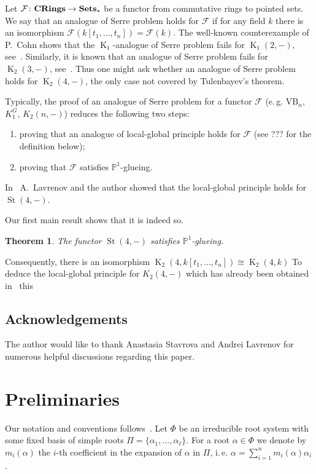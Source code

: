 \documentclass[oneside, 10pt]{amsart}
\DeclareMathOperator{\St}{St}
\DeclareMathOperator{\K}{K}
\newcommand{\catname}[1]{{\normalfont\textbf{#1}}}
\newtheorem{thm}{Theorem}
\numberwithin{equation}{section}
\numberwithin{lemma}{section}
\theoremstyle{definition}
\theoremstyle{remark}
\begin{document}
Let $\mathcal{F}\colon \catname{CRings} \to \catname{Sets}_*$ be a functor from commutative rings to pointed sets. We say that an analogue of Serre problem holds for $\mathcal{F}$ if for any field $k$ there is an isomorphism $\mathcal{F}(k[t_1, \ldots, t_n]) = \mathcal{F}(k)$. The well-known counterexample of P.~Cohn shows that the $\K_1$-analogue of Serre problem fails for $\K_1(2, -)$, see~\cite[\S~I.8]{Lam10}. Similarly, it is known that an analogue of Serre problem fails for $\K_2(3, -)$, see~\cite{We14}. Thus one might ask whether an analogue of Serre problem holds for $\K_2(4, -)$, the only case not covered by Tulenbayev's theorem.

Typically, the proof of an analogue of Serre problem for a functor $\mathcal{F}$ (e.\,g. $\mathrm{VB}_n$, $K_1^G$, $K_2(n, -)$) reduces the following two steps: 
\begin{enumerate}
 \item proving that an analogue of local-global principle holds for $\mathcal{F}$ (see ??? for the definition below);
 \item proving that $\mathcal{F}$ satisfies $\mathbb{P}^1$-glueing.
\end{enumerate}

In~\cite{LS17} A.~Lavrenov and the author showed that the local-global principle holds for $\St(4, -)$.


Our first main result shows that it is indeed so.
\begin{thm}
 The functor $\St(4, -)$ satisfies $\mathbb{P}^1$-glueing.
\end{thm}
Consequently, there is an isomorphism $\K_2(4, k[t_1, \ldots, t_n]) \cong \K_2(4, k)$
To deduce the local-global principle for $K_2(4, -)$ which has already been obtained in~\cite{LS17} this 


\subsection{Acknowledgements}
The author would like to thank Anastasia Stavrova and Andrei Lavrenov for numerous helpful discussions regarding this paper.

\section{Preliminaries}

Our notation and conventions follows~\cite[\S~4]{Vav09}.
Let $\Phi$ be an irreducible root system with some fixed basis of simple roots $\Pi = \{\alpha_1, \ldots, \alpha_\ell\}$.
For a root $\alpha\in\Phi$ we denote by $m_i(\alpha)$ the $i$-th coefficient in the expansion of $\alpha$ in $\Pi$,
 i.\,e. $\alpha = \sum_{i=1}^n m_i(\alpha) \alpha_i$.
\end{document}
